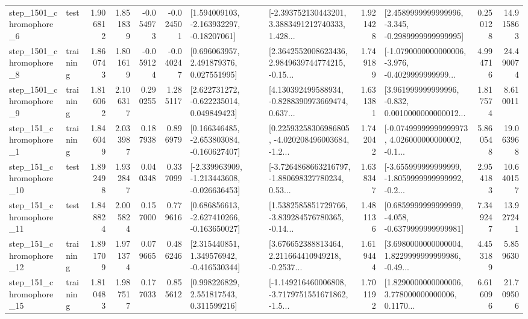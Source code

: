\begin{tabular}{llrrrrllrlrr}
  step\_1501\_chromophore\_6 &      test &      1.906812 &    1.851839 &     -0.054973 & -0.024501 &    [1.594009103, -2.163932297, -0.18207061] &  [-2.393752130443201, 3.3883491212740333, 1.428... &       1.921428 &  [2.4589999999999996, -3.345, -0.2989999999999995] &            0.250128 &         14.915863 \\
  step\_1501\_chromophore\_8 &  training &      1.860743 &    1.801619 &     -0.059124 & -0.040247 &     [0.696063957, 2.491879376, 0.027551995] &  [2.3642552008623436, 2.9849639744774215, -0.15... &       1.749189 &  [-1.0790000000000006, -3.976, -0.4029999999999... &            4.994716 &         24.490074 \\
  step\_1501\_chromophore\_9 &  training &      1.816062 &    2.106317 &      0.290255 &  1.285117 &    [2.622731272, -0.622235014, 0.049849423] &  [4.130392499588934, -0.8288390973669474, 0.637... &       1.631381 &  [3.961999999999996, -0.832, 0.0010000000000012... &            1.817574 &          8.610011 \\
   step\_151\_chromophore\_1 &  training &      1.846049 &    2.033987 &      0.187938 &  0.896979 &   [0.166346485, -2.653803084, -0.160627407] &  [0.22593258306986805, -4.020208496003684, -1.2... &       1.742042 &  [-0.07499999999999973, 4.026000000000002, -0.1... &            5.860548 &         19.063968 \\
  step\_151\_chromophore\_10 &      test &      1.892498 &    1.932847 &      0.040348 &  0.337099 &  [-2.339963909, -1.213443608, -0.026636453] &  [-3.7264868663216797, -1.880698327780234, 0.53... &       1.638347 &  [-3.655999999999999, -1.8059999999999992, -0.2... &            2.954183 &         10.640157 \\
  step\_151\_chromophore\_11 &      test &      1.848824 &    2.005824 &      0.157000 &  0.779616 &   [0.686856613, -2.627410266, -0.163650027] &  [1.5382585851729766, -3.839284576780365, -0.14... &       1.481136 &  [0.6859999999999999, -4.058, -0.6379999999999981] &            7.349247 &         13.927241 \\
  step\_151\_chromophore\_12 &  training &      1.891709 &    1.971374 &      0.079665 &  0.486246 &    [2.315440851, 1.349576942, -0.416530344] &  [3.676652388813464, 2.211664410949218, -0.2537... &       1.619444 &  [3.6980000000000004, 1.8229999999999986, -0.49... &            4.453189 &          5.859630 \\
  step\_151\_chromophore\_15 &  training &      1.810483 &    1.987517 &      0.177033 &  0.855612 &     [0.998226829, 2.551817543, 0.311599216] &  [-1.149216460006808, -3.7179751551671862, -1.5... &       1.701192 &  [1.8290000000000006, 3.778000000000006, 0.1170... &            6.616096 &         21.709506 \\

\end{tabular}

